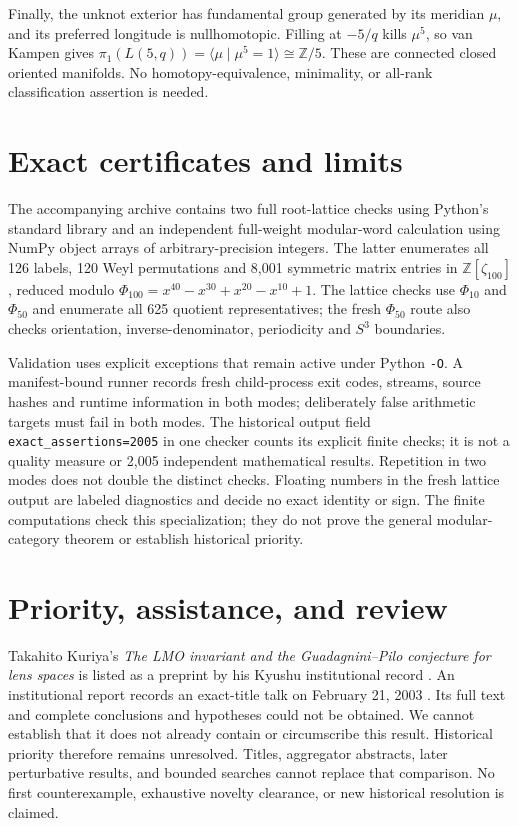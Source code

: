 \documentclass[11pt]{article}
\newcommand{\Z}{\mathbb Z}
\begin{document}
Finally, the unknot exterior has fundamental group generated by its
meridian $\mu$, and its preferred longitude is nullhomotopic.
Filling at $-5/q$ kills $\mu^5$, so van Kampen gives
$\pi_1(L(5,q))=\langle\mu\mid\mu^5=1\rangle\cong\Z/5$.
These are connected closed oriented manifolds. No homotopy-equivalence,
minimality, or all-rank classification assertion is needed.

\section{Exact certificates and limits}
The accompanying archive contains two full root-lattice checks using
Python's standard library and an independent full-weight modular-word
calculation using NumPy object arrays of arbitrary-precision integers.
The latter enumerates all 126 labels, 120 Weyl permutations and 8,001
symmetric matrix entries in $\Z[\zeta_{100}]$, reduced modulo
$\Phi_{100}=x^{40}-x^{30}+x^{20}-x^{10}+1$.
The lattice checks use $\Phi_{10}$ and $\Phi_{50}$ and enumerate all
625 quotient representatives; the fresh $\Phi_{50}$ route also checks
orientation, inverse-denominator, periodicity and $S^3$ boundaries.

Validation uses explicit exceptions that remain active under Python
\texttt{-O}. A manifest-bound runner records fresh child-process exit
codes, streams, source hashes and runtime information in both modes;
deliberately false arithmetic targets must fail in both modes. The
historical output field \texttt{exact\_assertions=2005} in one checker
counts its explicit finite checks; it is not a quality measure or 2,005
independent mathematical results. Repetition in two modes does not
double the distinct checks. Floating numbers in the fresh lattice
output are labeled diagnostics and decide no exact identity or sign.
The finite computations check this specialization; they do not prove
the general modular-category theorem or establish historical priority.

\section{Priority, assistance, and review}
Takahito Kuriya's \emph{The LMO invariant and the Guadagnini--Pilo
conjecture for lens spaces} is listed as a preprint by his Kyushu
institutional record \cite{K}. An institutional report records an
exact-title talk on February 21, 2003 \cite{KR}. Its full text and
complete conclusions and hypotheses could not be obtained. We cannot
establish that it does not already contain or circumscribe this result.
Historical priority therefore remains unresolved. Titles, aggregator
abstracts, later perturbative results, and bounded searches cannot
replace that comparison. No first counterexample, exhaustive novelty
clearance, or new historical resolution is claimed.
\end{document}
